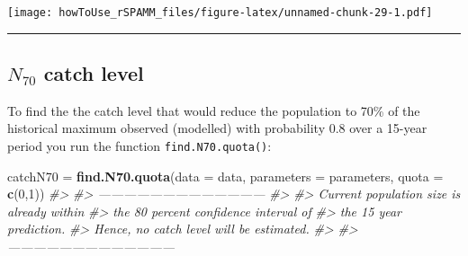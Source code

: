 \documentclass[
]{article}
\newenvironment{Shaded}{\begin{snugshade}}{\end{snugshade}}
\newcommand{\CommentTok}[1]{\textcolor[rgb]{0.56,0.35,0.01}{\textit{#1}}}
\newcommand{\DataTypeTok}[1]{\textcolor[rgb]{0.13,0.29,0.53}{#1}}
\newcommand{\DecValTok}[1]{\textcolor[rgb]{0.00,0.00,0.81}{#1}}
\newcommand{\KeywordTok}[1]{\textcolor[rgb]{0.13,0.29,0.53}{\textbf{#1}}}
\newcommand{\NormalTok}[1]{#1}
\newcommand{\OperatorTok}[1]{\textcolor[rgb]{0.81,0.36,0.00}{\textbf{#1}}}
\newcommand{\StringTok}[1]{\textcolor[rgb]{0.31,0.60,0.02}{#1}}
\begin{document}
\begin{Shaded}
\end{Shaded}

\texttt{[image: howToUse\_rSPAMM\_files/figure-latex/unnamed-chunk-29-1.pdf]}

\begin{center}\rule{0.5\linewidth}{0.5pt}\end{center}

\hypertarget{n_70-catch-level}{%
\subsection{\texorpdfstring{\(N_{70}\) catch
level}{N\_\{70\} catch level}}\label{n_70-catch-level}}

To find the the catch level that would reduce the population to 70\% of
the historical maximum observed (modelled) with probability 0.8 over a
15-year period you run the function \texttt{find.N70.quota()}:

\begin{Shaded}
\begin{Highlighting}[]
\NormalTok{catchN70 =}\StringTok{ }\KeywordTok{find.N70.quota}\NormalTok{(}\DataTypeTok{data =}\NormalTok{ data,}
                          \DataTypeTok{parameters =}\NormalTok{ parameters, }
                          \DataTypeTok{quota =} \KeywordTok{c}\NormalTok{(}\DecValTok{0}\NormalTok{,}\DecValTok{1}\NormalTok{))}
\CommentTok{#> }
\CommentTok{#>  ---------------------------------------}
\CommentTok{#> }
\CommentTok{#>  Current population size is already within}
\CommentTok{#>  the 80 percent confidence interval of}
\CommentTok{#>  the  15  year prediction.}
\CommentTok{#>  Hence, no catch level will be estimated.}
\CommentTok{#> }
\CommentTok{#>  ---------------------------------------}
\end{Highlighting}
\end{Shaded}
\end{document}

